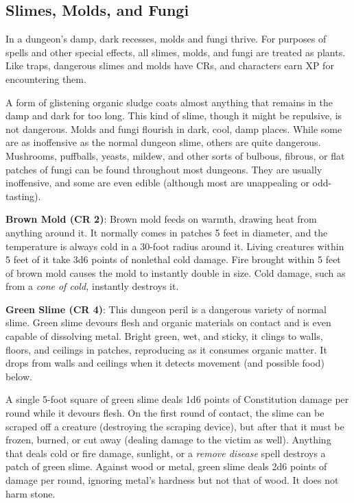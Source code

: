 \subsection{Slimes, Molds, and Fungi}

				
In a dungeon's damp, dark recesses, molds and fungi thrive. For purposes of spells and other special effects, all slimes, molds, and fungi are treated as plants. Like traps, dangerous slimes and molds have CRs, and characters earn XP for encountering them.
				
A form of glistening organic sludge coats almost anything that remains in the damp and dark for too long. This kind of slime, though it might be repulsive, is not dangerous. Molds and fungi flourish in dark, cool, damp places. While some are as inoffensive as the normal dungeon slime, others are quite dangerous. Mushrooms, puffballs, yeasts, mildew, and other sorts of bulbous, fibrous, or flat patches of fungi can be found throughout most dungeons. They are usually inoffensive, and some are even edible (although most are unappealing or odd-tasting).
				
\textbf{Brown Mold (CR 2)}: Brown mold feeds on warmth, drawing heat from anything around it. It normally comes in patches 5 feet in diameter, and the temperature is always cold in a 30-foot radius around it. Living creatures within 5 feet of it take 3d6 points of nonlethal cold damage. Fire brought within 5 feet of brown mold causes the mold to instantly double in size. Cold damage, such as from a \textit{cone of cold, }instantly destroys it.
				
\textbf{Green Slime (CR 4)}: This dungeon peril is a dangerous variety of normal slime. Green slime devours flesh and organic materials on contact and is even capable of dissolving metal. Bright green, wet, and sticky, it clings to walls, floors, and ceilings in patches, reproducing as it consumes organic matter. It drops from walls and ceilings when it detects movement (and possible food) below.
				
A single 5-foot square of green slime deals 1d6 points of Constitution damage per round while it devours flesh. On the first round of contact, the slime can be scraped off a creature (destroying the scraping device), but after that it must be frozen, burned, or cut away (dealing damage to the victim as well). Anything that deals cold or fire damage, sunlight, or a \textit{remove disease }spell destroys a patch of green slime. Against wood or metal, green slime deals 2d6 points of damage per round, ignoring metal's hardness but not that of wood. It does not harm stone.
				
